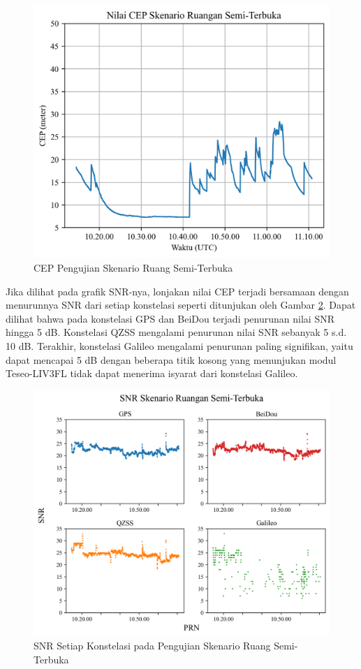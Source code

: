 \begin{figure}[H]
	\centering
	\includegraphics[width=13cm]{contents/chapter-4/3-skenario-semioutdoor/cep.png}
	\caption{CEP Pengujian Skenario Ruang Semi-Terbuka}
	\label{Fig: semioutdoor-cep}
\end{figure}

Jika dilihat pada grafik SNR-nya, lonjakan nilai CEP terjadi bersamaan dengan menurunnya SNR dari setiap konstelasi seperti ditunjukan oleh Gambar \ref{Fig: semioutdoor-snr}. Dapat dilihat bahwa pada konstelasi GPS dan BeiDou terjadi penurunan nilai SNR hingga 5 dB. Konstelasi QZSS mengalami penurunan nilai SNR sebanyak 5 s.d. 10 dB. Terakhir, konstelasi Galileo mengalami penurunan paling signifikan, yaitu dapat mencapai 5 dB dengan beberapa titik kosong yang menunjukan modul Teseo-LIV3FL tidak dapat menerima isyarat dari konstelasi Galileo.

\begin{figure}[H]
	\centering
	\includegraphics[width=13cm]{contents/chapter-4/3-skenario-semioutdoor/snr.png}
	\caption{SNR Setiap Konstelasi pada Pengujian Skenario Ruang Semi-Terbuka}
	\label{Fig: semioutdoor-snr}
\end{figure}

